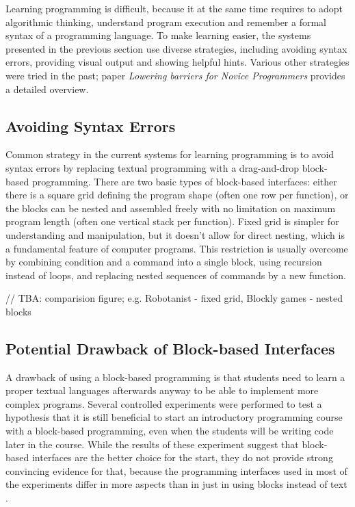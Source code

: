 \documentclass[
    digital,
    color,
    11pt,
    nocover,
    table,  %
    nolof,  %
    nolot,  %
    microtype,
]{fithesis3}
\begin{document}
Learning programming is difficult,
  because it at the same time requires
  to adopt algorithmic thinking,
  understand program execution
  and remember a formal syntax of a programming language.
To make learning easier,
  the systems presented in the previous section use diverse strategies,
  including avoiding syntax errors,
  providing visual output
  and showing helpful hints.
Various other strategies were tried in the past;
paper \emph{Lowering barriers for Novice Programmers}
  \cite{lowering-barriers}
  provides a detailed overview.


\subsection{Avoiding Syntax Errors}
\label{sec:avoiding-syntax-errors}

Common strategy in the current systems for learning programming is to avoid syntax errors
  by replacing textual programming with a drag-and-drop block-based programming.
There are two basic types of block-based interfaces:
  either there is a square grid defining the program shape
  (often one row per function),
  or the blocks can be nested and assembled freely with no limitation on maximum program length
  (often one vertical stack per function).
Fixed grid is simpler for understanding and manipulation,
  but it doesn’t allow for direct nesting,
  which is a fundamental feature of computer programs.
This restriction is usually overcome by
  combining condition and a command into a single block,
  using recursion instead of loops,
  and replacing nested sequences of commands by a new function.

// TBA: comparision figure; e.g. Robotanist - fixed grid, Blockly games - nested blocks


\subsection{Potential Drawback of Block-based Interfaces}
\label{sec:potential-drawback-of-block-based-interfaces}
A drawback of using a block-based programming
  is that students need to learn a proper textual languages afterwards anyway
  to be able to implement more complex programs.
Several controlled experiments were performed to test a hypothesis
  that it is still beneficial to start an introductory programming course
  with a block-based programming,
  even when the students will be writing code later in the course.
While the results of these experiment suggest that block-based interfaces
  are the better choice for the start,
  they do not provide strong convincing evidence for that,
  because the programming interfaces used in most of the experiments differ in more aspects
  than in just in using blocks instead of text
  \cite{comparing-textual-and-block-interfaces}.
\end{document}
